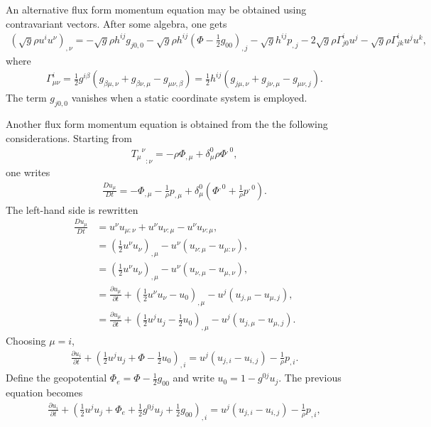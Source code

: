 \documentclass{article}
\begin{document}
An alternative flux form momentum equation may be obtained using contravariant vectors. After some algebra, one gets
\begin{align}
\left( \sqrt{g}\rho u^iu^\nu\right)_{,\nu} = - \sqrt{g} \rho h^{ij} g_{j0,0} - \sqrt{g} \rho h^{ij}\left( \Phi - \frac{1}{2} g_{00} \right)_{,j} - \sqrt{g}h^{ij}p_{,j} -2\sqrt{g} \rho \Gamma^i_{j0} u^j - \sqrt{g} \rho \Gamma^i_{jk}u^ju^k,
\end{align}
where
\begin{align}
\Gamma^i_{\mu\nu}=\frac{1}{2} g^{i\beta}(g_{\beta\mu,\nu}+g_{\beta\nu,\mu}-g_{\mu\nu,\beta})=\frac{1}{2} h^{ij}(g_{j\mu,\nu}+g_{j\nu,\mu}-g_{\mu\nu,j}).
\end{align}
The term $g_{j0,0}$ vanishes when a static coordinate system is employed.

Another flux form momentum equation is obtained from the the following considerations. Starting from
\begin{align}
{{T_\mu}^\nu}_{:\nu} = -\rho \Phi_{,\mu} + \delta^0_\mu \rho \Phi^{,0}, \label{li}
\end{align}
one writes
\begin{align}
\frac{Du_\mu}{Dt}= -\Phi_{,\mu} -\frac{1}{\rho} p_{,\mu} + \delta^0_\mu \left( \Phi^{,0} + \frac{1}{\rho} p^{,0}\right).
\end{align}
The left-hand side is rewritten
\begin{align}
\frac{Du_\mu}{Dt}&=u^\nu u_{\mu:\nu} + u^\nu u_{\nu:\mu}-u^\nu u_{\nu:\mu}, \\
                 &= \left( \frac{1}{2} u^\nu u_{\nu}\right)_{,\mu}-u^\nu (u_{\nu:\mu} -u_{\mu:\nu} ), \\
		 &= \left( \frac{1}{2} u^\nu u_{\nu}\right)_{,\mu}-u^\nu (u_{\nu,\mu} -u_{\mu,\nu} ), \\
		 &= \frac{\partial u_\mu}{\partial t} + \left( \frac{1}{2} u^\nu u_{\nu} -u_0\right)_{,\mu} -u^j (u_{j,\mu} -u_{\mu,j} ), \\
		 &= \frac{\partial u_\mu}{\partial t} + \left( \frac{1}{2} u^j u_j -\frac{1}{2}u_0\right)_{,\mu} -u^j (u_{j,\mu} -u_{\mu,j} ).
\end{align}
Choosing $\mu=i$,
\begin{align}
\frac{\partial u_i}{\partial t} + \left( \frac{1}{2} u^j u_j +\Phi -\frac{1}{2}u_0\right)_{,i} =u^j (u_{j,i} -u_{i,j} ) -\frac{1}{\rho} p_{,i}.
\end{align}
Define the geopotential $\Phi_e=\Phi-\frac{1}{2}g_{00}$ and write $u_0=1-g^{0j}u_j$. The previous equation becomes
\begin{align}
\frac{\partial u_i}{\partial t} + \left( \frac{1}{2} u^j u_j +\Phi_e +\frac{1}{2}g^{0j}u_j+\frac{1}{2}g_{00}\right)_{,i} =u^j (u_{j,i} -u_{i,j} ) -\frac{1}{\rho} p_{,i},
\end{align}
\end{document}
